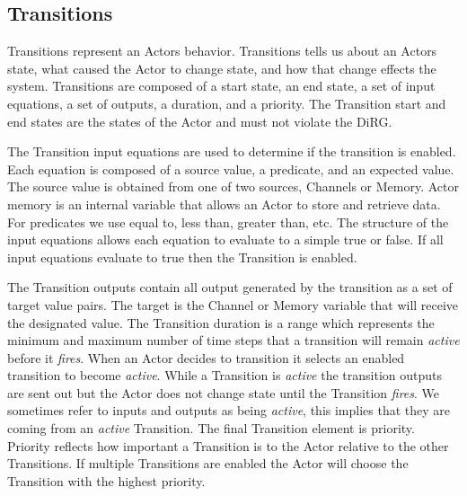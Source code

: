 \subsection{Transitions}
Transitions represent an Actors behavior.  Transitions tells us about an Actors state, what caused the Actor to change state, and how that change effects the system.  Transitions are composed of a start state, an end state, a set of input equations, a set of outputs, a duration, and a priority.  The Transition start and end states are the states of the Actor and must not violate the DiRG.  

The Transition input equations are used to determine if the transition is enabled.  Each equation is composed of a source value, a predicate, and an expected value.  The source value is obtained from one of two sources, Channels or Memory.  Actor memory is an internal variable that allows an Actor to store and retrieve data.  For predicates we use equal to, less than, greater than, etc.  The structure of the input equations allows each equation to evaluate to a simple true or false.  If all input equations evaluate to true then the Transition is enabled.  

The Transition outputs contain all output generated by the transition as a set of target value pairs.  The target is the Channel or Memory variable that will receive the designated value.  The Transition duration is a range which represents the minimum and maximum number of time steps that a transition will remain {\em active} before it {\em fires}.  When an Actor decides to transition it selects an enabled transition to become {\em active}.  While a Transition is {\em active} the transition outputs are sent out but the Actor does not change state until the Transition {\em fires}.  We sometimes refer to inputs and outputs as being {\em active}, this implies that they are coming from an {\em active} Transition.  The final Transition element is priority.  Priority reflects how important a Transition is to the Actor relative to the other Transitions.  If multiple Transitions are enabled the Actor will choose the Transition with the highest priority.

